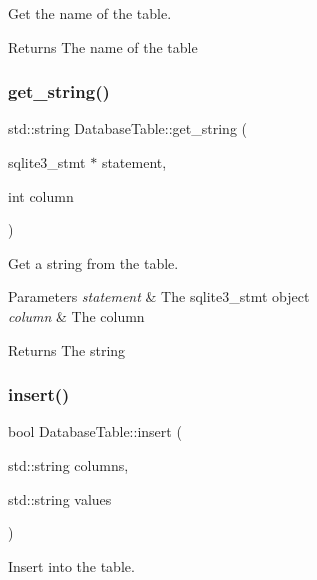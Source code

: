 Get the name of the table. 

\begin{DoxyReturn}{Returns}
The name of the table 
\end{DoxyReturn}
\mbox{\label{class_database_table_af40064f4da53b2e99aca18c908655d46}} 
\subsubsection{\texorpdfstring{get\+\_\+string()}{get\_string()}}
{\footnotesize\ttfamily std\+::string Database\+Table\+::get\+\_\+string (\begin{DoxyParamCaption}\item[{sqlite3\+\_\+stmt $\ast$}]{statement,  }\item[{int}]{column }\end{DoxyParamCaption})}



Get a string from the table. 


\begin{DoxyParams}{Parameters}
{\em statement} & The sqlite3\+\_\+stmt object \\
\hline
{\em column} & The column \\
\hline
\end{DoxyParams}
\begin{DoxyReturn}{Returns}
The string 
\end{DoxyReturn}
\mbox{\label{class_database_table_a91151267d595dd3b6b1f78f0919fd4e5}} 
\subsubsection{\texorpdfstring{insert()}{insert()}}
{\footnotesize\ttfamily bool Database\+Table\+::insert (\begin{DoxyParamCaption}\item[{std\+::string}]{columns,  }\item[{std\+::string}]{values }\end{DoxyParamCaption})}



Insert into the table. 


